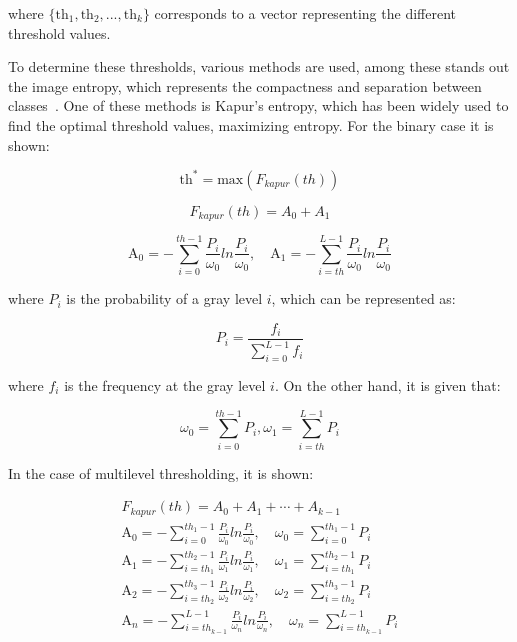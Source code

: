 \documentclass{elsarticle}
\begin{document}
\noindent
where $\{\text{th}_1,\text{th}_2,...,\text{th}_k\}$ corresponds to a vector representing the different threshold values. 

To determine these thresholds, various methods are used, among these stands out the image entropy, which represents the compactness and separation between classes~\cite{Pun1980}. One of these methods is Kapur's entropy, which has been widely used to find the optimal threshold values, maximizing entropy. For the binary case it is shown:

\begin{equation}
\text{th}^* = \text{max}(F_{kapur}(th))
\label{eq3}
\end{equation}

\begin{equation}
F_{kapur}(th) = A_0 + A_1
\label{eq4}
\end{equation}

\begin{equation}
\text{A}_0 = - \sum_{i=0}^{th-1} \frac{P_i}{\omega_0} ln\frac{P_i}{\omega_0}, \quad \text{A}_1 = - \sum_{i=th}^{L-1} \frac{P_i}{\omega_0} ln\frac{P_i}{\omega_0}
\label{eq5}
\end{equation}

\noindent 
where $P_i$ is the probability of a gray level $i$, which can be represented as:

\begin{equation}
P_i =\frac{f_i}{\sum_{i=0}^{L-1} f_i}   
\label{eq6}
\end{equation}

\noindent 
where $f_i$ is the frequency at the gray level $i$. On the other hand, it is given that:

\begin{equation}
\omega_0 = \sum_{i=0}^{th-1} P_i ,   \omega_1 = \sum_{i=th}^{L-1} P_i
\label{eq7}
\end{equation}

In the case of multilevel thresholding, it is shown:

\begin{equation}
\begin{gathered}
F_{kapur}(th) = A_0 + A_1 + \cdots + A_{k-1} \\
\text{A}_0 = - \sum_{i=0}^{th_1-1} \frac{P_i}{\omega_0} ln\frac{P_i}{\omega_0}, \quad \omega_0 = \sum_{i=0}^{th_1-1} P_i  \\
\text{A}_1 = - \sum_{i=th_1}^{th_{2}-1} \frac{P_i}{\omega_1} ln\frac{P_i}{\omega_1}, \quad \omega_1 = \sum_{i=th_1}^{th_{2}-1} P_i \\
\text{A}_2 = - \sum_{i=th_2}^{th_{3}-1} \frac{P_i}{\omega_2} ln\frac{P_i}{\omega_2}, \quad \omega_2 = \sum_{i=th_2}^{th_{3}-1} P_i \\
\text{A}_n = - \sum_{i=th_{k-1}}^{L-1} \frac{P_i}{\omega_n} ln\frac{P_i}{\omega_n}, \quad \omega_n = \sum_{i=th_{k-1}}^{L-1} P_i 
\end{gathered}
\label{eq8}
\end{equation}
\end{document}
